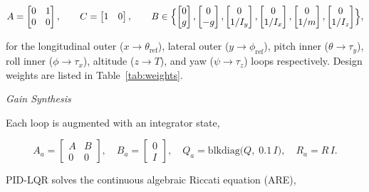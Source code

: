 \documentclass[10pt,letterpaper]{article}
\newcommand{\headingthree}[1]{%
    \par\vspace{6pt}%
    {\centering\fontsize{10}{12}\selectfont\itshape #1\par}%
    \vspace{2pt}\noindent\ignorespaces}
\begin{document}
\begin{equation}
    \label{eq:e25}
    A=\begin{bmatrix}0&1\\0&0\end{bmatrix},\qquad
    C=\begin{bmatrix}1&0\end{bmatrix},\qquad
    B\in\Bigl\{\begin{bmatrix}0\\g\end{bmatrix},
    \begin{bmatrix}0\\-g\end{bmatrix},
    \begin{bmatrix}0\\1/I_{y}\end{bmatrix},
    \begin{bmatrix}0\\1/I_{x}\end{bmatrix},
    \begin{bmatrix}0\\1/m\end{bmatrix},
    \begin{bmatrix}0\\1/I_z\end{bmatrix}\Bigr\},
\end{equation}

for the longitudinal outer ($x\!\to\!\theta_{\mathrm{ref}}$), lateral outer
($y\!\to\!\phi_{\mathrm{ref}}$), pitch inner ($\theta\!\to\!\tau_y$), roll inner
($\phi\!\to\!\tau_x$), altitude ($z\!\to\!T$), and yaw ($\psi\!\to\!\tau_z$) loops
respectively. Design weights are listed in Table~\ref{tab:weights}.

\headingthree{Gain Synthesis}

Each loop is augmented with an integrator state,

\begin{equation}
    \label{eq:e26}
    A_a=\begin{bmatrix}A&B\\0&0\end{bmatrix},\quad
    B_a=\begin{bmatrix}0\\I\end{bmatrix},\quad
    Q_a=\mathrm{blkdiag}\bigl(Q,\;0.1\,I\bigr),\quad
    R_a=R\,I .
\end{equation}

PID-LQR solves the continuous algebraic Riccati equation (ARE),
\end{document}

